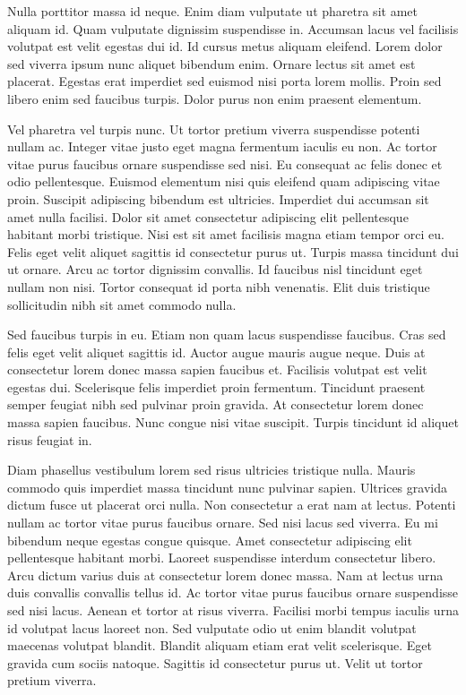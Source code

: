 \documentclass[11pt,a4paper]{article}
\begin{document}
Nulla porttitor massa id neque. Enim diam vulputate ut pharetra sit amet aliquam id. Quam vulputate dignissim suspendisse in. Accumsan lacus vel facilisis volutpat est velit egestas dui id. Id cursus metus aliquam eleifend. Lorem dolor sed viverra ipsum nunc aliquet bibendum enim. Ornare lectus sit amet est placerat. Egestas erat imperdiet sed euismod nisi porta lorem mollis. Proin sed libero enim sed faucibus turpis. Dolor purus non enim praesent elementum.

Vel pharetra vel turpis nunc. Ut tortor pretium viverra suspendisse potenti nullam ac. Integer vitae justo eget magna fermentum iaculis eu non. Ac tortor vitae purus faucibus ornare suspendisse sed nisi. Eu consequat ac felis donec et odio pellentesque. Euismod elementum nisi quis eleifend quam adipiscing vitae proin. Suscipit adipiscing bibendum est ultricies. Imperdiet dui accumsan sit amet nulla facilisi. Dolor sit amet consectetur adipiscing elit pellentesque habitant morbi tristique. Nisi est sit amet facilisis magna etiam tempor orci eu. Felis eget velit aliquet sagittis id consectetur purus ut. Turpis massa tincidunt dui ut ornare. Arcu ac tortor dignissim convallis. Id faucibus nisl tincidunt eget nullam non nisi. Tortor consequat id porta nibh venenatis. Elit duis tristique sollicitudin nibh sit amet commodo nulla.

Sed faucibus turpis in eu. Etiam non quam lacus suspendisse faucibus. Cras sed felis eget velit aliquet sagittis id. Auctor augue mauris augue neque. Duis at consectetur lorem donec massa sapien faucibus et. Facilisis volutpat est velit egestas dui. Scelerisque felis imperdiet proin fermentum. Tincidunt praesent semper feugiat nibh sed pulvinar proin gravida. At consectetur lorem donec massa sapien faucibus. Nunc congue nisi vitae suscipit. Turpis tincidunt id aliquet risus feugiat in.

Diam phasellus vestibulum lorem sed risus ultricies tristique nulla. Mauris commodo quis imperdiet massa tincidunt nunc pulvinar sapien. Ultrices gravida dictum fusce ut placerat orci nulla. Non consectetur a erat nam at lectus. Potenti nullam ac tortor vitae purus faucibus ornare. Sed nisi lacus sed viverra. Eu mi bibendum neque egestas congue quisque. Amet consectetur adipiscing elit pellentesque habitant morbi. Laoreet suspendisse interdum consectetur libero. Arcu dictum varius duis at consectetur lorem donec massa. Nam at lectus urna duis convallis convallis tellus id. Ac tortor vitae purus faucibus ornare suspendisse sed nisi lacus. Aenean et tortor at risus viverra. Facilisi morbi tempus iaculis urna id volutpat lacus laoreet non. Sed vulputate odio ut enim blandit volutpat maecenas volutpat blandit. Blandit aliquam etiam erat velit scelerisque. Eget gravida cum sociis natoque. Sagittis id consectetur purus ut. Velit ut tortor pretium viverra.
\end{document}

